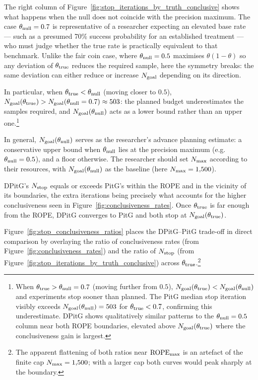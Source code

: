 The right column of Figure~\ref{fig:stop_iterations_by_truth_conclusive} shows what
happens when the null does not coincide with the precision maximum.
The case $\theta_{\rm null}=0.7$ is representative of a researcher expecting an elevated
base rate --- such as a presumed 70\% success probability for an established treatment ---
who must judge whether the true rate is practically equivalent to that benchmark.
Unlike the fair coin case, where $\theta_{\rm null}=0.5$ maximises $\theta(1-\theta)$
so any deviation of $\theta_{\rm true}$ reduces the required sample, here the symmetry
breaks: the same deviation can either reduce or increase $N_{\rm goal}$ depending on
its direction.

In particular, when $\theta_{\rm true}<\theta_{\rm null}$ (moving closer to $0.5$),
$N_{\rm goal}(\theta_{\rm true})>N_{\rm goal}(\theta_{\rm null}=0.7)\approx 503$:
the planned budget underestimates the samples required, and
$N_{\rm goal}(\theta_{\rm null})$ acts as a lower bound rather than an upper
one.\footnote{When $\theta_{\rm true}>\theta_{\rm null}=0.7$ (moving further from
$0.5$), $N_{\rm goal}(\theta_{\rm true})<N_{\rm goal}(\theta_{\rm null})$ and
experiments stop sooner than planned.
The PitG median stop iteration visibly exceeds $N_{\rm goal}(\theta_{\rm null})=503$
for $\theta_{\rm true}<0.7$, confirming this underestimate.
DPitG shows qualitatively similar patterns to the $\theta_{\rm null}=0.5$ column
near both ROPE boundaries, elevated above $N_{\rm goal}(\theta_{\rm true})$ where
the conclusiveness gain is largest.}

In general, $N_{\rm goal}(\theta_{\rm null})$ serves as the researcher's advance
planning estimate: a conservative upper bound when $\theta_{\rm null}$ lies at the
precision maximum (e.g.\ $\theta_{\rm null}=0.5$), and a floor otherwise.
The researcher should set $N_{\rm max}$ according to their resources, with
$N_{\rm goal}(\theta_{\rm null})$ as the baseline (here $N_{\rm max}=1{,}500$).

DPitG's $N_{\rm stop}$ equals or exceeds PitG's within the ROPE and in the vicinity
of its boundaries, the extra iterations being precisely what accounts for the higher
conclusiveness seen in Figure~\ref{fig:conclusiveness_rates}. Once $\theta_{\rm true}$
is far enough from the ROPE, DPitG converges to PitG and both stop at
$N_{\rm goal}(\theta_{\rm true})$.

Figure~\ref{fig:stop_conclusiveness_ratios} places the DPitG--PitG trade-off in direct
comparison by overlaying the ratio of conclusiveness rates
(from Figure~\ref{fig:conclusiveness_rates}) and the ratio of $N_{\rm stop}$
(from Figure~\ref{fig:stop_iterations_by_truth_conclusive}) across $\theta_{\rm true}$.\footnote{The
apparent flattening of both ratios near ${\rm ROPE}_{\rm max}$ is an artefact of
the finite cap $N_{\rm max}=1{,}500$; with a larger cap both curves would peak sharply
at the boundary.}


